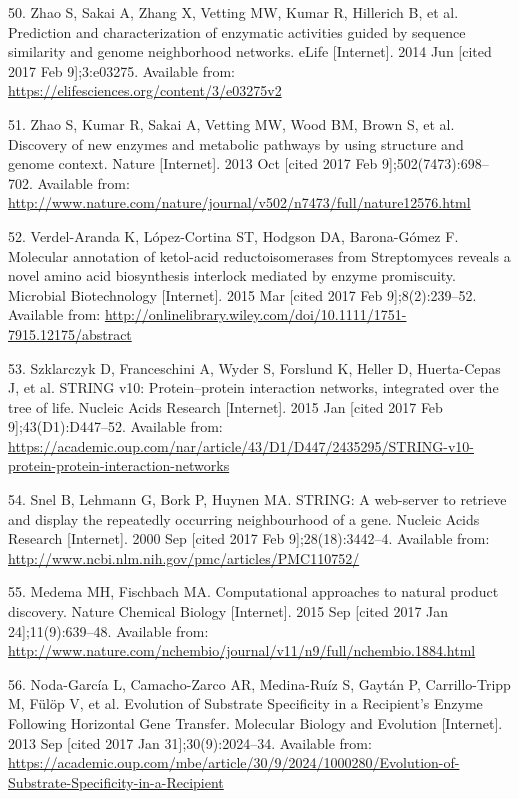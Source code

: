 \documentclass[12pt,twoside]{reedthesis}
\begin{document}
  \hypertarget{ref-zhao_prediction_2014}{}
  50. Zhao S, Sakai A, Zhang X, Vetting MW, Kumar R, Hillerich B, et al.
  Prediction and characterization of enzymatic activities guided by
  sequence similarity and genome neighborhood networks. eLife
  {[}Internet{]}. 2014 Jun {[}cited 2017 Feb 9{]};3:e03275. Available
  from: \url{https://elifesciences.org/content/3/e03275v2}
  
  \hypertarget{ref-zhao_discovery_2013}{}
  51. Zhao S, Kumar R, Sakai A, Vetting MW, Wood BM, Brown S, et al.
  Discovery of new enzymes and metabolic pathways by using structure and
  genome context. Nature {[}Internet{]}. 2013 Oct {[}cited 2017 Feb
  9{]};502(7473):698--702. Available from:
  \url{http://www.nature.com/nature/journal/v502/n7473/full/nature12576.html}
  
  \hypertarget{ref-verdel-aranda_molecular_2015}{}
  52. Verdel-Aranda K, López-Cortina ST, Hodgson DA, Barona-Gómez F.
  Molecular annotation of ketol-acid reductoisomerases from Streptomyces
  reveals a novel amino acid biosynthesis interlock mediated by enzyme
  promiscuity. Microbial Biotechnology {[}Internet{]}. 2015 Mar {[}cited
  2017 Feb 9{]};8(2):239--52. Available from:
  \url{http://onlinelibrary.wiley.com/doi/10.1111/1751-7915.12175/abstract}
  
  \hypertarget{ref-szklarczyk_string_2015}{}
  53. Szklarczyk D, Franceschini A, Wyder S, Forslund K, Heller D,
  Huerta-Cepas J, et al. STRING v10: Protein--protein interaction
  networks, integrated over the tree of life. Nucleic Acids Research
  {[}Internet{]}. 2015 Jan {[}cited 2017 Feb 9{]};43(D1):D447--52.
  Available from:
  \url{https://academic.oup.com/nar/article/43/D1/D447/2435295/STRING-v10-protein-protein-interaction-networks}
  
  \hypertarget{ref-snel_string:_2000}{}
  54. Snel B, Lehmann G, Bork P, Huynen MA. STRING: A web-server to
  retrieve and display the repeatedly occurring neighbourhood of a gene.
  Nucleic Acids Research {[}Internet{]}. 2000 Sep {[}cited 2017 Feb
  9{]};28(18):3442--4. Available from:
  \url{http://www.ncbi.nlm.nih.gov/pmc/articles/PMC110752/}
  
  \hypertarget{ref-medema_computational_2015}{}
  55. Medema MH, Fischbach MA. Computational approaches to natural product
  discovery. Nature Chemical Biology {[}Internet{]}. 2015 Sep {[}cited
  2017 Jan 24{]};11(9):639--48. Available from:
  \url{http://www.nature.com/nchembio/journal/v11/n9/full/nchembio.1884.html}
  
  \hypertarget{ref-noda-garcia_evolution_2013}{}
  56. Noda-García L, Camacho-Zarco AR, Medina-Ruíz S, Gaytán P,
  Carrillo-Tripp M, Fülöp V, et al. Evolution of Substrate Specificity in
  a Recipient's Enzyme Following Horizontal Gene Transfer. Molecular
  Biology and Evolution {[}Internet{]}. 2013 Sep {[}cited 2017 Jan
  31{]};30(9):2024--34. Available from:
  \url{https://academic.oup.com/mbe/article/30/9/2024/1000280/Evolution-of-Substrate-Specificity-in-a-Recipient}
  
\end{document}
